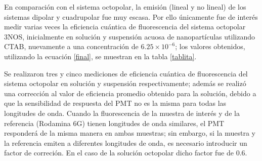 En comparaci\'on con el sistema octopolar, la emisi\'on (lineal y no lineal) de los sistemas dipolar y cuadrupolar fue muy escasa. Por ello \'unicamente fue de inter\'es medir varias veces la eficiencia cu\'antica de fluorescencia del sistema octopolar 3NOS, inicialmente en soluci\'on y suspensi\'on acuosa de nanopart\'iculas utilizando CTAB, nuevamente a una concentraci\'on de $6.25 \times 10^{-6}$; los valores obtenidos, utilizando la ecuaci\'on \ref{final}, se muestran en la tabla \ref{tablita}. 

Se realizaron tres y cinco mediciones de eficiencia cu\'antica de fluorescencia del sistema octopolar en soluci\'on y suspensi\'on respectivamente; adem\'as se realiz\'o una correcci\'on al valor de eficiencia promedio obtenido para la soluci\'on, debido a que la sensibilidad de respuesta del PMT no es la misma para todas las longitudes de onda. Cuando la fluorescencia de la muestra de inter\'es y de la referencia (Rodamina 6G) tienen longitudes de onda similares, el PMT responder\'a de la misma manera en ambas muestras; sin embargo, si la muestra y la referencia emiten a diferentes longitudes de onda, es necesario introducir un factor de correci\'on. En el caso de la soluci\'on octopolar dicho factor fue de 0.6.

\begin{table}[H]
\centering
{} 
\caption{ Valores obtenidos de eficiencia cu\'antica de fluorescencia $\Phi$ para el sistema octopolar  \label{tablita}}
\end{table}



